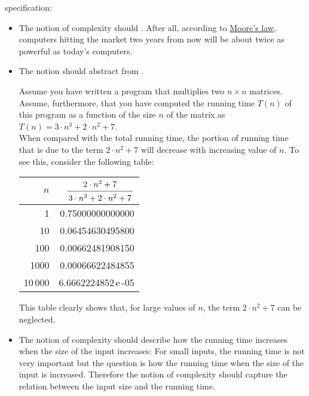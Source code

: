specification: 
\begin{itemize}
\item The notion of complexity should .  After all, according to 
      \href{http://en.wikipedia.org/wiki/Moore's_law}{Moore's law}, 
      computers hitting the market two years from now will be about twice as powerful as today's computers.

\item The notion should abstract from .

      Assume you have written a program that  multiplies two $n \times n$ matrices.  Assume,
      furthermore, that you have computed the running time $T(n)$ of this program as a function 
      of the size $n$ of the matrix as
      \\[0.2cm]
      \hspace*{1.3cm} $T(n) = 3 \cdot n^3 + 2 \cdot n^2 + 7$. 
      \\[0.2cm]
      When compared with the total running time, the portion of running time that is due to the term 
      $2\cdot n^2 + 7$ will decrease with increasing value of $n$.  To see this, consider the
      following table:
      \\[0.3cm]
      \hspace*{1.3cm} 
      \begin{tabular}{|r|r|}
        \hline
        $n$  & \rule{0pt}{16pt} $\bruch{2 \cdot n^2 + 7}{3 \cdot n^3 + 2 \cdot n^2 + 7}$ \\[0.3cm]
        \hline
        \hline
        1       &  0.75000000000000  \\
        10      &  0.06454630495800  \\
        100     &  0.00662481908150  \\
        1000    &  0.00066622484855  \\
        10\,000 &  6.6662224852\,e\,-05  \\
       \hline
      \end{tabular}

      This table clearly shows that, for large values of $n$, the term $2 \cdot n^2 + 7$ can be
      neglected. 
\item The notion of complexity should describe how the running time increases
      when the size of the input increases:  For small inputs, the running time is not very
      important but the question is how the running time  when the size of the input is increased. 
      Therefore the notion of complexity should capture the relation between the input size and the running time.
\end{itemize}
